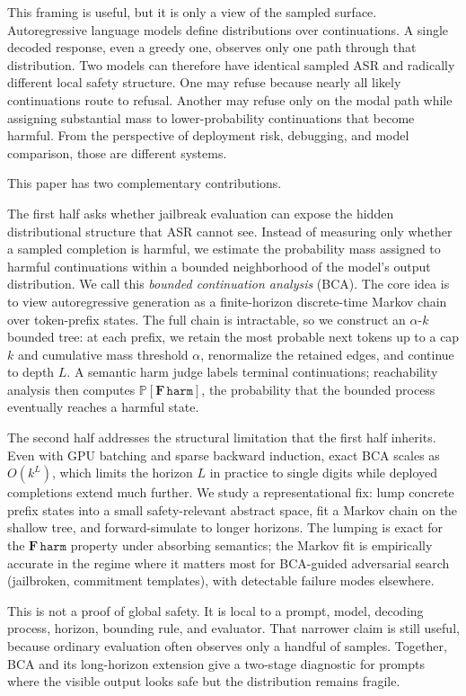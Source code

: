 \documentclass[11pt]{article}
\newcommand{\Prob}{\mathbb{P}}
\newcommand{\harm}{\texttt{harm}}
\newcommand{\BCA}{\textsc{BCA}}
\newcommand{\ASR}{\textsc{ASR}}
\begin{document}
This framing is useful, but it is only a view of the sampled surface.  Autoregressive language models define distributions over continuations.  A single decoded response, even a greedy one, observes only one path through that distribution.  Two models can therefore have identical sampled \ASR{} and radically different local safety structure.  One may refuse because nearly all likely continuations route to refusal.  Another may refuse only on the modal path while assigning substantial mass to lower-probability continuations that become harmful.  From the perspective of deployment risk, debugging, and model comparison, those are different systems.

This paper has two complementary contributions.

The first half asks whether jailbreak evaluation can expose the hidden distributional structure that \ASR{} cannot see.  Instead of measuring only whether a sampled completion is harmful, we estimate the probability mass assigned to harmful continuations within a bounded neighborhood of the model's output distribution.  We call this \emph{bounded continuation analysis} (\BCA).  The core idea is to view autoregressive generation as a finite-horizon discrete-time Markov chain over token-prefix states.  The full chain is intractable, so we construct an $\alpha$-$k$ bounded tree: at each prefix, we retain the most probable next tokens up to a cap $k$ and cumulative mass threshold $\alpha$, renormalize the retained edges, and continue to depth $L$.  A semantic harm judge labels terminal continuations; reachability analysis then computes $\Prob[\mathbf{F}\,\harm]$, the probability that the bounded process eventually reaches a harmful state.

The second half addresses the structural limitation that the first half inherits.  Even with GPU batching and sparse backward induction, exact \BCA{} scales as $O(k^L)$, which limits the horizon $L$ in practice to single digits while deployed completions extend much further.  We study a representational fix: lump concrete prefix states into a small safety-relevant abstract space, fit a Markov chain on the shallow tree, and forward-simulate to longer horizons.  The lumping is exact for the $\mathbf{F}\,\harm$ property under absorbing semantics; the Markov fit is empirically accurate in the regime where it matters most for \BCA-guided adversarial search (jailbroken, commitment templates), with detectable failure modes elsewhere.

This is not a proof of global safety.  It is local to a prompt, model, decoding process, horizon, bounding rule, and evaluator.  That narrower claim is still useful, because ordinary evaluation often observes only a handful of samples.  Together, \BCA{} and its long-horizon extension give a two-stage diagnostic for prompts where the visible output looks safe but the distribution remains fragile.
\end{document}
